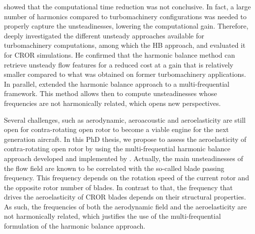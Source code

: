 showed that the computational time reduction
was not conclusive. In fact, a large number of 
harmonics compared to turbomachinery configurations
was needed to properly capture the unsteadinesses, lowering
the computational gain.
Therefore, \citet{ThesisFrancois} deeply
investigated the different unsteady approaches available 
for turbomachinery computations, among which the HB approach, 
and evaluated it for CROR simulations. 
He confirmed that
the harmonic balance method can retrieve unsteady
flow features for a reduced cost at a gain that
is relatively smaller compared to what was
obtained on former turbomachinery applications.
In parallel, \citet{ThesisGuedeney} extended the harmonic
balance approach to a multi-frequential framework. 
This method allows then to compute unsteadinesses whose frequencies
are not harmonically related, which opens new perspectives.
\newline

Several challenges, such as aerodynamic,
aeroacoustic and aeroelasticity are still open 
for contra-rotating open rotor
to become a viable engine for the next generation aircraft.
In this PhD thesis, we propose to assess the aeroelasticity of 
contra-rotating open rotor by using the multi-frequential
harmonic balance approach developed and implemented 
by \citet{ThesisGuedeney}.
Actually, the main unsteadinesses of the flow field
are known to be correlated with the so-called
blade passing frequency. This frequency depends on the
rotation speed of the current rotor and the opposite rotor
number of blades. In contrast to that, the 
frequency that drives the aeroelasticity of CROR
blades depends on their structural properties.
As such, the frequencies of both the aerodynamic
field and the aeroelasticity are not harmonically
related, which justifies the use of the multi-frequential
formulation of the harmonic balance approach.


